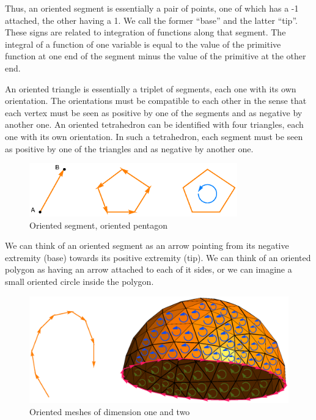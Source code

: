 Thus, an oriented segment is essentially a pair of points, one of which has a \hbox{-1}
attached, the other having a 1.
We call the former ``base'' and the latter ``tip''.
These signs are related to integration of functions along that segment.
The integral of a function of one variable is equal to the value of the 
primitive function at one end of the segment minus the value of the primitive at the other end.

An oriented triangle is essentially a triplet of segments, each one with its own orientation.
The orientations must be compatible to each other in the sense that each vertex 
must be seen as positive by one of the segments and as negative by another one.
An oriented tetrahedron can be identified with four triangles, each one with its own
orientation.
In such a tetrahedron, each segment must be seen as positive by one of the triangles and
as negative by another one.

\begin{figure}[ht] \centering
  \includegraphics[width=90mm]{oriented-cells.eps}
  \caption{Oriented segment, oriented pentagon}
  \label{\numb section 1.\numb fig 2}
\end{figure}

We can think of an oriented segment as an arrow pointing from its negative extremity (base)
towards its positive extremity (tip).
We can think of an oriented polygon as having an arrow attached to each of it sides,
or we can imagine a small oriented circle inside the polygon.

\begin{figure} \centering
  \includegraphics[width=115mm]{hemisphere-7}
  \caption{Oriented meshes of dimension one and two}
  \label{\numb section 1.\numb fig 3}
\end{figure}

